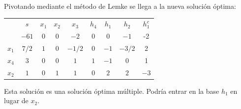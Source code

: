 Pivotando mediante el método de Lemke se llega a la nueva solución óptima:
 \begin{center}
    \begin{tabular}{c|c|ccccccc|}
     & $s$ & $x_1$ & $x_2$ & $x_3$ & $h_4$ &$h_1$ & $h_2$ & $h^c_1$ \\
     & $-61$ & $0$ & $0$ & $-2$ & $0$ &$0$ & $-1$ &-2 \\
    \hline
    $x_1$ & $7/2$  & $1$ & $0$ & $-1/2$ & $0$ & $-1$ & $-3/2$&2\\
    $x_4$ & $3$  & $0$ & $0$ & $1$ & $1$ &  $-1$ &$0$ &1\\
    $x_2$ & $1$  & $0$ & $1$ & $1$ & $0$ &  $2$ &$2$ & $-3$\\
    \hline
    \end{tabular}
\end{center}

Esta solución es una solución óptima múltiple. Podría entrar en la base $h_1$ en lugar de $x_2$. 